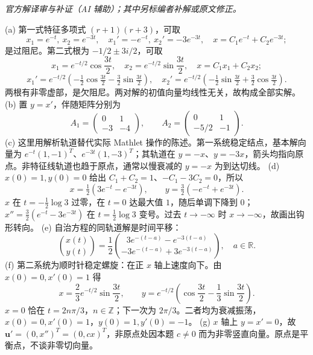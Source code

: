 \begin{solution}
\textit{官方解译审与补证（AI 辅助）；其中另标编者补解或原文修正。}\par

(a) 第一式特征多项式 $(r+1)(r+3)$，可取
\[x_1=e^{-t},\ x_2=e^{-3t},\quad x_1'=-e^{-t},\ x_2'=-3e^{-3t},\quad x=C_1e^{-t}+C_2e^{-3t};\]
是过阻尼。第二式根为 $-1/2\pm3i/2$，可取
\[x_1=e^{-t/2}\cos\frac{3t}2,\quad x_2=e^{-t/2}\sin\frac{3t}2,\quad x=C_1x_1+C_2x_2;\]
\[x_1'=e^{-t/2}\left(-\tfrac12\cos\tfrac{3t}2-\tfrac32\sin\tfrac{3t}2\right),\quad x_2'=e^{-t/2}\left(-\tfrac12\sin\tfrac{3t}2+\tfrac32\cos\tfrac{3t}2\right).\]
两根有非零虚部，是欠阻尼。两对解的初值向量均线性无关，故构成全部实解。
(b) 置 $y=x'$，伴随矩阵分别为
\[A_1=\begin{pmatrix}0&1\\-3&-4\end{pmatrix},\qquad A_2=\begin{pmatrix}0&1\\-5/2&-1\end{pmatrix}.\]
(c) 这里用解析轨道替代实际 Mathlet 操作的陈述。第一系统稳定结点，基本解向量为 $e^{-t}(1,-1)^T$、$e^{-3t}(1,-3)^T$；其轨道在 $y=-x$、$y=-3x$，箭头均指向原点。非特征线轨道也趋于原点，通常以慢衰减的 $y=-x$ 为到达切线。
(d) $x(0)=1,y(0)=0$ 给出 $C_1+C_2=1$、$-C_1-3C_2=0$，所以
\[x=\tfrac12(3e^{-t}-e^{-3t}),\qquad y=\tfrac32(-e^{-t}+e^{-3t}).\]
$x$ 在 $t=-\tfrac12\log3$ 过零，在 $t=0$ 达最大值 $1$，随后单调下降到 $0$；$x''=\tfrac32(e^{-t}-3e^{-3t})$ 在 $t=\tfrac12\log3$ 变号。过去 $t\to-\infty$ 时 $x\to-\infty$，故画出钩形转向。
(e) 自治方程的同轨道解是时间平移：
\[\binom{x(t)}{y(t)}=\frac12\binom{3e^{-(t-a)}-e^{-3(t-a)}}{-3e^{-(t-a)}+3e^{-3(t-a)}},\quad a\in\mathbb R.\]
(f) 第二系统为顺时针稳定螺旋：在正 $x$ 轴上速度向下。由 $x(0)=0,x'(0)=1$ 得
\[x=\frac23e^{-t/2}\sin\frac{3t}2,\qquad y=e^{-t/2}\left(\cos\frac{3t}2-\frac13\sin\frac{3t}2\right).\]
$x=0$ 恰在 $t=2n\pi/3$，$n\in\mathbb Z$；下一次为 $2\pi/3$。二者均为衰减振荡，$x(0)=0,x'(0)=1$，$y(0)=1,y'(0)=-1$。
(g) $x$ 轴上 $y=x'=0$，故 $\mathbf u'=(0,x'')^T=(0,cx)^T$，非原点处因本题 $c\ne0$ 而为非零竖直向量。原点是平衡点，不谈非零切向量。
\begin{center}
\end{center}
\end{solution}
